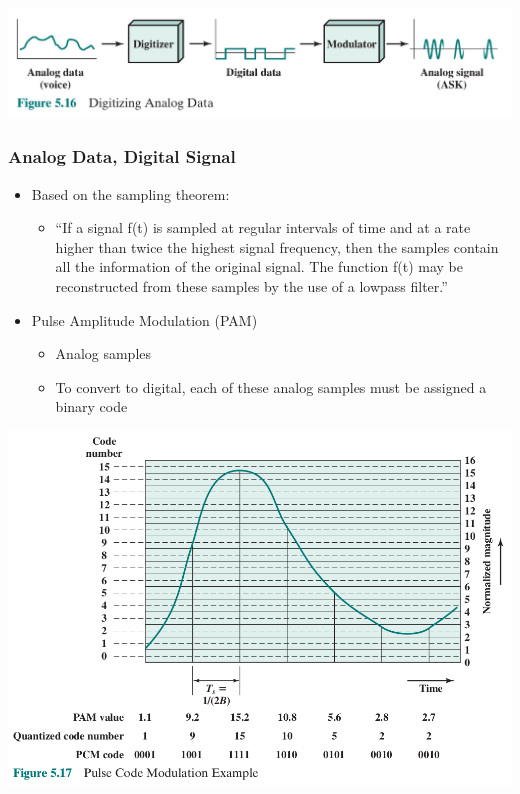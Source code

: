 \documentclass[pdflatex,compress]{beamer}
\begin{document}
\begin{frame}
	\begin{center}
		\includegraphics[width=\linewidth]{img/img23}
	\end{center}
\end{frame}

\begin{frame}
	\frametitle{Analog Data, Digital Signal}
	\begin{itemize}
		\item Based on the sampling theorem:
		\begin{itemize}
			\item “If a signal f(t) is sampled at regular intervals of time and at a rate higher than twice the highest signal frequency, then the samples contain all the information of the original signal. The function f(t) may be reconstructed from these samples by the use of a lowpass filter.”
		\end{itemize}
		\item Pulse Amplitude Modulation (PAM)
		\begin{itemize}
			\item Analog samples
			\item To convert to digital, each of these analog samples must be assigned a binary code
		\end{itemize}
	\end{itemize}
\end{frame}

\begin{frame}
	\begin{center}
		\includegraphics[width=0.9\linewidth]{img/img24}
	\end{center}
\end{frame}
\end{document}

